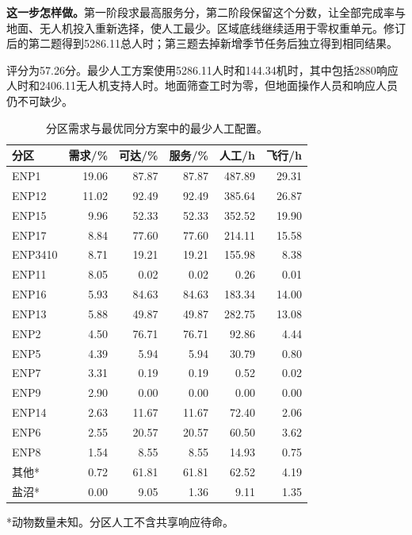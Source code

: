 \documentclass[12pt,a4paper]{article}
\numberwithin{equation}{section}
\begin{document}
\noindent\textbf{这一步怎样做。}第一阶段求最高服务分，第二阶段保留这个分数，让全部完成率与地面、无人机投入重新选择，使人工最少。区域底线继续适用于零权重单元。修订后的第二题得到5286.11总人时；第三题去掉新增季节任务后独立得到相同结果。


评分为57.26分。最少人工方案使用5286.11人时和144.34机时，其中包括2880响应人时和2406.11无人机支持人时。地面筛查工时为零，但地面操作人员和响应人员仍不可缺少。

\begin{table}[H]
\centering\normalsize
\caption{分区需求与最优同分方案中的最少人工配置。}
\label{tab:regions}
\begin{tabular}{lrrrrr}
\toprule
分区 & 需求/\% & 可达/\% & 服务/\% & 人工/h & 飞行/h \\
\midrule
ENP1 & 19.06 & 87.87 & 87.87 & 487.89 & 29.31 \\
ENP12 & 11.02 & 92.49 & 92.49 & 385.64 & 26.87 \\
ENP15 & 9.96 & 52.33 & 52.33 & 352.52 & 19.90 \\
ENP17 & 8.84 & 77.60 & 77.60 & 214.11 & 15.58 \\
ENP3410 & 8.71 & 19.21 & 19.21 & 155.98 & 8.38 \\
ENP11 & 8.05 & 0.02 & 0.02 & 0.26 & 0.01 \\
ENP16 & 5.93 & 84.63 & 84.63 & 183.34 & 14.00 \\
ENP13 & 5.88 & 49.87 & 49.87 & 282.75 & 13.08 \\
ENP2 & 4.50 & 76.71 & 76.71 & 92.86 & 4.44 \\
ENP5 & 4.39 & 5.94 & 5.94 & 30.79 & 0.80 \\
ENP7 & 3.31 & 0.19 & 0.19 & 0.52 & 0.02 \\
ENP9 & 2.90 & 0.00 & 0.00 & 0.00 & 0.00 \\
ENP14 & 2.63 & 11.67 & 11.67 & 72.40 & 2.06 \\
ENP6 & 2.55 & 20.57 & 20.57 & 60.50 & 3.62 \\
ENP8 & 1.54 & 8.55 & 8.55 & 14.93 & 0.75 \\
其他* & 0.72 & 61.81 & 61.81 & 62.52 & 4.19 \\
盐沼* & 0.00 & 9.05 & 1.36 & 9.11 & 1.35 \\
\bottomrule
\end{tabular}
\par\smallskip\begin{minipage}{\linewidth}*动物数量未知。分区人工不含共享响应待命。\end{minipage}
\end{table}
\end{document}

